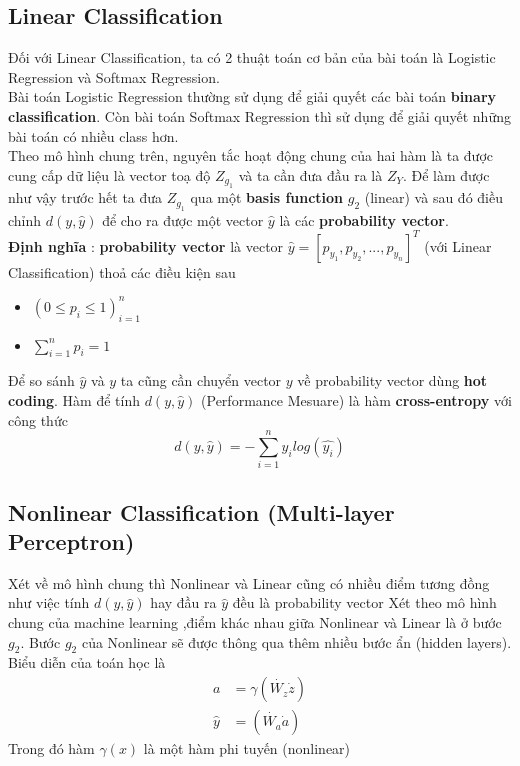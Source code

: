 \documentclass[12pt]{article}
\newcommand{\<}{\langle}
\renewcommand{\>}{\rangle}
\theoremstyle{definition}
\begin{document}
\subsection{Linear Classification}
Đối với Linear Classification, ta có 2 thuật toán cơ bản của bài toán là Logistic Regression và Softmax Regression.\\ 
Bài toán Logistic Regression thường sử dụng để giải quyết các bài toán \textbf{binary classification}. Còn bài toán Softmax Regression thì sử dụng để giải quyết những bài toán có nhiều class hơn. \\
Theo mô hình chung trên, nguyên tắc hoạt động chung của hai hàm là ta được cung cấp dữ liệu là vector toạ độ $Z_{g_{1}}$ và ta cần đưa đầu ra là $Z_Y$. Để làm được như vậy trước hết ta đưa $Z_{g_{1}}$ qua một \textbf{basis function} $g_2$ (linear) và sau đó điều chỉnh $d(y,\widehat{y})$ để cho ra được một vector $\widehat{y}$ là các \textbf{probability vector}.\\
\textbf{Định nghĩa} : \textbf{probability vector} là vector $\widehat{y}=[p_{y_{1}},p_{y_{2}},...,p_{y_{n}}]^T$ (với Linear Classification) thoả các điều kiện sau 
\begin{itemize}
    \item $(0 \le p_i \le 1)_{i=1}^{n}$
    \item $\sum_{i=1}^{n}p_i=1$
\end{itemize}
Để so sánh $\widehat{y}$ và $y$ ta cũng cần chuyển vector $y$ về probability vector dùng \textbf{hot coding}. 
Hàm để tính $d(y,\widehat{y})$ (Performance Mesuare) là hàm \textbf{cross-entropy} với công thức $$d(y,\widehat{y})=-\sum_{i=1}^{n}y_ilog(\widehat{y_{i}}) $$

\subsection{Nonlinear Classification (Multi-layer Perceptron)}
Xét về mô hình chung thì Nonlinear và Linear cũng có nhiều điểm tương đồng như việc tính $d(y,\widehat{y})$ hay đầu ra $\widehat{y}$ đều là probability vector
Xét theo mô hình chung của machine learning ,điểm khác nhau giữa Nonlinear và Linear là ở bước $g_2$. Bước $g_2$ của Nonlinear sẽ được thông qua thêm nhiều bước ẩn (hidden layers). Biểu diễn của toán học là
\begin{align*}
    a&=\gamma(\dot{W_{z}}\dot{z})\\
    \widehat{y}&=(\dot{W_{a}}\dot{a})
\end{align*}
Trong đó hàm $\gamma(x)$ là một hàm phi tuyến (nonlinear)
\end{document}
